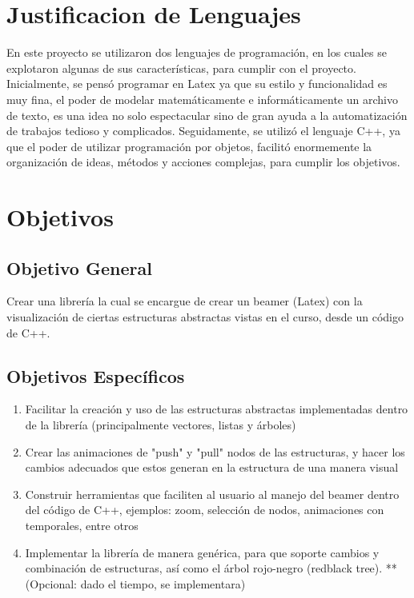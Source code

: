 \documentclass[12pt,letterpaper]{article}     %
\begin{document}
\section{Justificacion de Lenguajes}

En este proyecto se utilizaron dos lenguajes de programación, en los cuales se explotaron algunas de sus características, para cumplir con el proyecto. Inicialmente, se pensó programar en Latex ya que su estilo y funcionalidad es muy fina, el poder de modelar matemáticamente e informáticamente un archivo de texto, es una idea no solo espectacular sino de gran ayuda a la automatización de trabajos tedioso y complicados. Seguidamente, se utilizó el lenguaje C++, ya que el poder de utilizar programación por objetos, facilitó enormemente la organización de ideas, métodos y acciones complejas, para cumplir los objetivos.

\section{Objetivos}

\subsection{Objetivo General} 

Crear una librería la cual se encargue de crear un beamer (Latex) con la visualización de ciertas estructuras abstractas vistas en el curso, desde un código de C++.

\subsection{Objetivos Específicos}

\begin{enumerate}
\item Facilitar la creación y uso de las estructuras abstractas implementadas dentro de la librería (principalmente vectores, listas y árboles)

\item Crear las animaciones de "push" y "pull" nodos de las estructuras, y hacer los cambios adecuados que estos generan en la estructura de una manera visual

\item Construir herramientas que faciliten al usuario al manejo del beamer dentro del código de C++, ejemplos: zoom, selección de nodos, animaciones con temporales, entre otros

\item Implementar la librería de manera genérica, para que soporte cambios y combinación de estructuras, así como el árbol rojo-negro (redblack tree).  ** (Opcional: dado el tiempo, se implementara)\end{enumerate}
\end{document}

